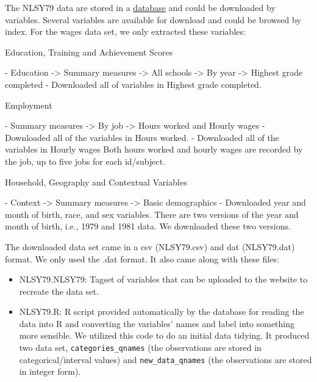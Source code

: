 \documentclass[12pt]{article}
\providecommand{\tightlist}{%
  \setlength{\itemsep}{0pt}\setlength{\parskip}{0pt}}
\begin{document}
The NLSY79 data are stored in a \href{https://www.nlsinfo.org/content/cohorts/nlsy79/get-data}{database} and could be downloaded by variables. Several variables are available for download and could be browsed by index. For the wages data set, we only extracted these variables:

\begin{tcolorbox}[width=\textwidth,
                  boxsep=5pt,
                  left=5pt,
                  right=5pt,
                  top=5pt,
                  ]
Education, Training and Achievement Scores

- Education -> Summary measures -> All schools -> By year -> Highest grade completed
  - Downloaded all of variables in Highest grade completed.
  
Employment

- Summary measures -> By job -> Hours worked and Hourly wages
  - Downloaded all of the variables in Hours worked.
  - Downloaded all of the variables in Hourly wages
  Both hours worked and hourly wages are recorded by the job, up to five jobs for each id/subject. 
  
Household, Geography and Contextual Variables

- Context -> Summary measures -> Basic demographics 
  - Downloaded year and month of birth, race, and sex variables.
  There are two versions of the year and month of birth, i.e., 1979 and 1981 data. We downloaded these two versions.

\end{tcolorbox}

The downloaded data set came in a csv (NLSY79.csv) and dat (NLSY79.dat) format. We only used the .dat format. It also came along with these files:

\begin{itemize}
\tightlist
\item
  NLSY79.NLSY79: Tagset of variables that can be uploaded to the website to recreate the data set.
\item
  NLSY79.R: R script provided automatically by the database for reading the data into R and converting the variables' names and label into something more sensible. We utilized this code to do an initial data tidying. It produced two data set, \texttt{categories\_qnames} (the observations are stored in categorical/interval values) and \texttt{new\_data\_qnames} (the observations are stored in integer form).
\end{itemize}
\end{document}
